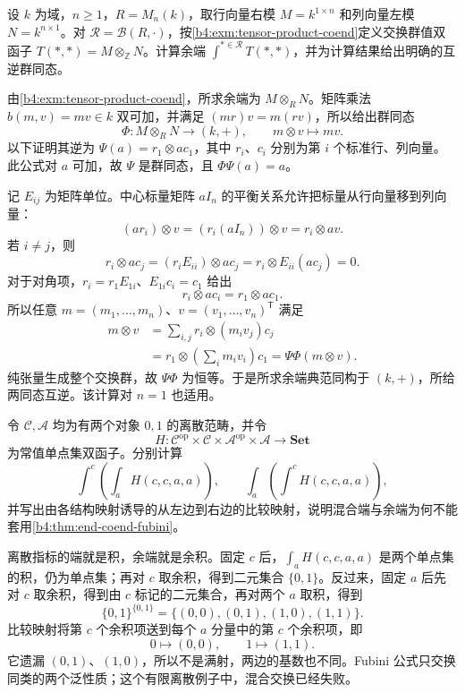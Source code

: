 \begin{optionalexercise}\label{b4:ex:03-matrix-ring-tensor-coend}
	设 \(k\) 为域，\(n\ge1\)，\(R=M_n(k)\)，取行向量右模 \(M=k^{1\times n}\) 和列向量左模 \(N=k^{n\times1}\)。对 \(\mathcal R=\mathcal B(R,\cdot)\)，按\cref{b4:exm:tensor-product-coend}定义交换群值双函子 \(T(*,*)=M\otimes_{\mathbb Z}N\)。计算余端 \(\int^{*\in\mathcal R}T(*,*)\)，并为计算结果给出明确的互逆群同态。
\end{optionalexercise}
\begin{solution}
	由\cref{b4:exm:tensor-product-coend}，所求余端为 \(M\otimes_RN\)。矩阵乘法 \(b(m,v)=mv\in k\) 双可加，并满足 \((mr)v=m(rv)\)，所以给出群同态
	\[
		\Phi:M\otimes_RN\longrightarrow(k,+),
		\qquad m\otimes v\longmapsto mv.
	\]
	以下证明其逆为 \(\Psi(a)=r_1\otimes ac_1\)，其中 \(r_i\)、\(c_i\) 分别为第 \(i\) 个标准行、列向量。此公式对 \(a\) 可加，故 \(\Psi\) 是群同态，且 \(\Phi\Psi(a)=a\)。

	记 \(E_{ij}\) 为矩阵单位。中心标量矩阵 \(aI_n\) 的平衡关系允许把标量从行向量移到列向量：
	\[
		(ar_i)\otimes v
		=(r_i(aI_n))\otimes v
		=r_i\otimes av.
	\]
	若 \(i\ne j\)，则
	\[
		r_i\otimes ac_j
		=(r_iE_{ii})\otimes ac_j
		=r_i\otimes E_{ii}(ac_j)=0.
	\]
	对于对角项，\(r_i=r_1E_{1i}\)、\(E_{1i}c_i=c_1\) 给出
	\[
		r_i\otimes ac_i=r_1\otimes ac_1.
	\]
	所以任意 \(m=(m_1,\ldots,m_n)\)、\(v=(v_1,\ldots,v_n)^{\mathsf T}\) 满足
	\[
		\begin{aligned}
			m\otimes v
			&=\sum_{i,j}r_i\otimes(m_iv_j)c_j\\
			&=r_1\otimes\left(\sum_i m_iv_i\right)c_1
			=\Psi\Phi(m\otimes v).
		\end{aligned}
	\]
	纯张量生成整个交换群，故 \(\Psi\Phi\) 为恒等。于是所求余端典范同构于 \((k,+)\)，所给两同态互逆。该计算对 \(n=1\) 也适用。
\end{solution}

\begin{optionalexercise}\label{b4:ex:03-mixed-end-coend-failure}
	令 \(\mathcal C,\mathcal A\) 均为有两个对象 \(0,1\) 的离散范畴，并令
	\[
		H:\mathcal C^{\mathrm{op}}\times\mathcal C
		\times\mathcal A^{\mathrm{op}}\times\mathcal A
		\longrightarrow\mathbf{Set}
	\]
	为常值单点集双函子。分别计算
	\[
		\int^c\left(\int_aH(c,c,a,a)\right),
		\qquad
		\int_a\left(\int^cH(c,c,a,a)\right),
	\]
	并写出由各结构映射诱导的从左边到右边的比较映射，说明混合端与余端为何不能套用\cref{b4:thm:end-coend-fubini}。
\end{optionalexercise}
\begin{solution}
	离散指标的端就是积，余端就是余积。固定 \(c\) 后，\(\int_aH(c,c,a,a)\) 是两个单点集的积，仍为单点集；再对 \(c\) 取余积，得到二元集合 \(\{0,1\}\)。反过来，固定 \(a\) 后先对 \(c\) 取余积，得到由 \(c\) 标记的二元集合，再对两个 \(a\) 取积，得到
	\[
		\{0,1\}^{\{0,1\}}
		=\{(0,0),(0,1),(1,0),(1,1)\}.
	\]
	比较映射将第 \(c\) 个余积项送到每个 \(a\) 分量中的第 \(c\) 个余积项，即
	\[
		0\longmapsto(0,0),\qquad1\longmapsto(1,1).
	\]
	它遗漏 \((0,1)\)、\((1,0)\)，所以不是满射，两边的基数也不同。Fubini 公式只交换同类的两个泛性质；这个有限离散例子中，混合交换已经失败。
\end{solution}
